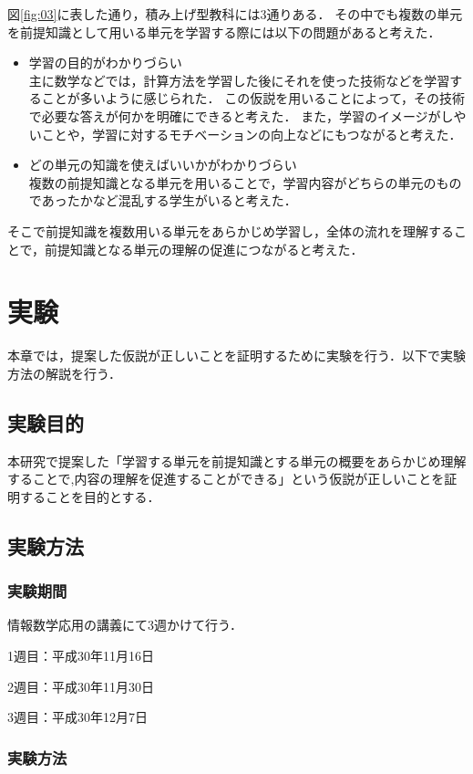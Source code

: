 \documentclass[a4j,12pt]{jsarticle}
\begin{document}
図\ref{fig:03}に表した通り，積み上げ型教科には3通りある．
その中でも複数の単元を前提知識として用いる単元を学習する際には以下の問題があると考えた．

\begin{itemize}
\item 学習の目的がわかりづらい\\
主に数学などでは，計算方法を学習した後にそれを使った技術などを学習することが多いように感じられた．
この仮説を用いることによって，その技術で必要な答えが何かを明確にできると考えた．
また，学習のイメージがしやいことや，学習に対するモチベーションの向上などにもつながると考えた．

\item どの単元の知識を使えばいいかがわかりづらい\\
複数の前提知識となる単元を用いることで，学習内容がどちらの単元のものであったかなど混乱する学生がいると考えた．
\end{itemize}


そこで前提知識を複数用いる単元をあらかじめ学習し，全体の流れを理解することで，前提知識となる単元の理解の促進につながると考えた．



\newpage
\section{実験}
本章では，提案した仮説が正しいことを証明するために実験を行う．以下で実験方法の解説を行う．
\subsection{実験目的}
本研究で提案した「学習する単元を前提知識とする単元の概要をあらかじめ理解することで,内容の理解を促進することができる」という仮説が正しいことを証明することを目的とする．

\subsection{実験方法}
\subsubsection{実験期間}

情報数学応用の講義にて3週かけて行う．

1週目：平成30年11月16日

2週目：平成30年11月30日

3週目：平成30年12月7日


\subsubsection{実験方法}
\end{document}
